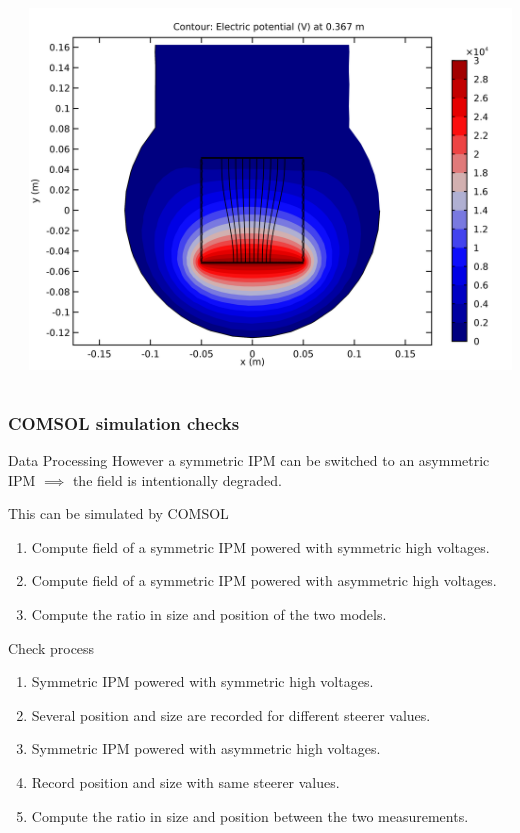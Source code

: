 \begin{frame}[t]
\begin{columns}[T]
\begin{column}{0.45\textwidth}
    \end{column}
    \begin{column}{0.45\textwidth}
      \centering
      \includegraphics[width=1\textwidth]{06_Backup/fig/fig021_image_asym_sym_a}
    \end{column}
  \end{columns}
\end{frame}

\begin{frame}[t]
  \frametitle{COMSOL simulation checks}
  \begin{block}{Data Processing}
    However a symmetric IPM can be switched to an asymmetric IPM $\implies$ the field is intentionally degraded.
  \end{block}

  \begin{block}{This can be simulated by COMSOL}
    \begin{enumerate}
      \item Compute field of a symmetric IPM powered with symmetric high voltages.
      \item Compute field of a symmetric IPM powered with asymmetric high voltages.
      \item Compute the ratio in size and position of the two models.
    \end{enumerate}
  \end{block}

  \begin{block}{Check process}
    \begin{enumerate}
      \item Symmetric IPM powered with symmetric high voltages.
      \item Several position and size are recorded for different steerer values.
      \item Symmetric IPM powered with asymmetric high voltages.
      \item Record position and size with same steerer values.
      \item Compute the ratio in size and position between the two measurements.
    \end{enumerate}
  \end{block}
\end{frame}

